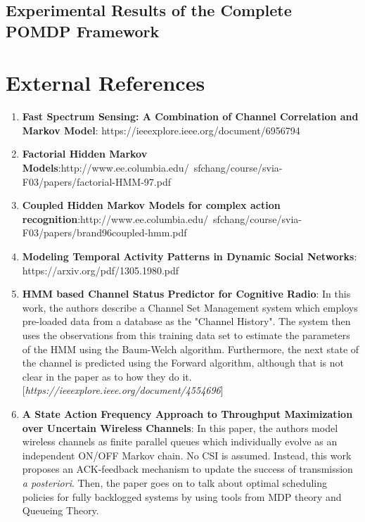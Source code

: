 \documentclass[12pt, draftcls, onecolumn]{IEEEtran}
\begin{document}
\subsection{Experimental Results of the Complete POMDP Framework}
\section{External References}
\begin{enumerate}
    \item \textbf{Fast Spectrum Sensing: A Combination of Channel Correlation and Markov Model}: https://ieeexplore.ieee.org/document/6956794
    \item \textbf{Factorial Hidden Markov Models}:\newline http://www.ee.columbia.edu/~sfchang/course/svia-F03/papers/factorial-HMM-97.pdf
    \item \textbf{Coupled Hidden Markov Models for complex action recognition}:\newline http://www.ee.columbia.edu/~sfchang/course/svia-F03/papers/brand96coupled-hmm.pdf
    \item \textbf{Modeling Temporal Activity Patterns in Dynamic Social
    Networks}: \\https://arxiv.org/pdf/1305.1980.pdf
    \item \textbf{HMM based Channel Status Predictor for Cognitive Radio}: In this work, the authors describe a Channel Set Management system which employs pre-loaded data from a database as the "Channel History". The system then uses the observations from this training data set to estimate the parameters of the HMM using the Baum-Welch algorithm. Furthermore, the next state of the channel is predicted using the Forward algorithm, although that is not clear in the paper as to how they do it. [\textit{https://ieeexplore.ieee.org/document/4554696}]
    \item \textbf{A State Action Frequency Approach to Throughput Maximization over Uncertain Wireless Channels}: In this paper, the authors model wireless channels as finite parallel queues which individually evolve as an independent ON/OFF Markov chain. No CSI is assumed. Instead, this work proposes an ACK-feedback mechanism to update the success of transmission \textit{a posteriori}. Then, the paper goes on to talk about optimal scheduling policies for fully backlogged systems by using tools from MDP theory and Queueing Theory.

\end{enumerate}
\end{document}
